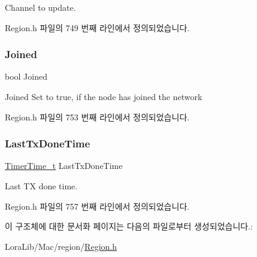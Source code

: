 Channel to update. 

Region.\+h 파일의 749 번째 라인에서 정의되었습니다.

\mbox{\label{structs_set_band_tx_done_params_ac2f6caa0f3b02d2ac5056c3ee7c22652}} 
\subsubsection{\texorpdfstring{Joined}{Joined}}
{\footnotesize\ttfamily bool Joined}

Joined Set to true, if the node has joined the network 

Region.\+h 파일의 753 번째 라인에서 정의되었습니다.

\mbox{\label{structs_set_band_tx_done_params_a7316dfb002c4e0015fceeb727020fe5c}} 
\subsubsection{\texorpdfstring{Last\+Tx\+Done\+Time}{LastTxDoneTime}}
{\footnotesize\ttfamily \mbox{\hyperlink{utilities_8h_a4215ca43d3e953099ea758ce428599d0}{Timer\+Time\+\_\+t}} Last\+Tx\+Done\+Time}

Last TX done time. 

Region.\+h 파일의 757 번째 라인에서 정의되었습니다.



이 구조체에 대한 문서화 페이지는 다음의 파일로부터 생성되었습니다.\+:\begin{DoxyCompactItemize}
\item 
Lora\+Lib/\+Mac/region/\mbox{\hyperlink{_region_8h}{Region.\+h}}\end{DoxyCompactItemize}
